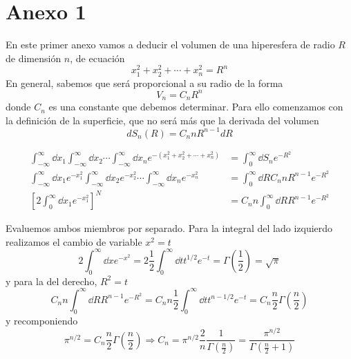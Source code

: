 \newpage
\section*{Anexo 1}\label{Anx1}
\renewcommand{\theequation}{A\textsubscript{1}.\arabic{equation}}

En este primer anexo vamos a deducir el volumen de una hiperesfera de radio $R$ de dimensión $n$, de ecuación
\begin{equation}
	x_1^2+x_2^2 + \cdots + x_n^2 = R^n
\end{equation}
En general, sabemos que será proporcional a su radio de la forma
\begin{equation}
	V_n = C_nR^n
\end{equation}
donde $C_n$ es una constante que debemos determinar.
Para ello comenzamos con la definición de la superficie, que no será más que la derivada del volumen
\begin{equation}
	dS_n(R) = C_n n R^{n-1} dR
\end{equation}

\begin{align}
	\int_{-\infty}^{\infty} \dd{x_1} \int_{-\infty}^{\infty} \dd{x_2} \cdots \int_{-\infty}^{\infty} \dd{x_n}e^{-(x_1^2+x_2^2 + \cdots + x_n^2)} &= \int_{0}^{\infty} \dd{S_n} e^{-R^2} \nonumber \\
	\int_{-\infty}^{\infty} \dd{x_1} e^{-x_1^2} \int_{-\infty}^{\infty} \dd{x_2} e^{-x_2^2} \cdots \int_{-\infty}^{\infty} \dd{x_n} e^{-x_n^2} &= \int_{0}^{\infty} \dd{R} C_n n R^{n-1} e^{-R^2} \\
	\left[ 2 \int_{0}^{\infty} \dd{x_1} e^{-x_1^2} \right]^N &=  C_n n \int_{0}^{\infty} \dd{R} R^{n-1} e^{-R^2}\nonumber
\end{align}

Evaluemos ambos miembros por separado.
Para la integral del lado izquierdo realizamos el cambio de variable $x^2=t$
\begin{equation}
	2 \int_{0}^{\infty} \dd{x} e^{-x^2} = 2\frac{1}{2} \int_{0}^{\infty} \dd{t} t^{1/2} e^{-t} = \Gamma\left(\frac{1}{2}\right) = \sqrt{\pi}
\end{equation}
y para la del derecho, $R^2 = t$
\begin{equation}
	C_n n \int_{0}^{\infty} \dd{R} R^{n-1} e^{-R^2} = C_n n \frac{1}{2} \int_{0}^{\infty} \dd{t} t^{n - 1/2} e^{-t} = C_n \frac{n}{2} \Gamma\left(\frac{n}{2}\right)
\end{equation}
y recomponiendo
\begin{equation}
	\pi^{n/2} = C_n \frac{n}{2} \Gamma\left(\frac{n}{2}\right) \Rightarrow C_n = \pi^{n/2}\frac{2}{n}\frac{1}{\Gamma\left(\frac{n}{2}\right)} = \frac{\pi^{n/2}}{\Gamma\left(\frac{n}{2} + 1 \right)}
\end{equation}

